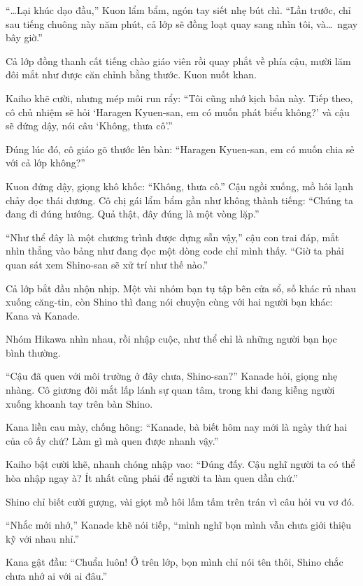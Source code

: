 \documentclass[../main.tex]{subfiles}
\begin{document}
``\dots Lại khúc dạo đầu,'' Kuon lẩm bẩm, ngón tay siết nhẹ bút chì. ``Lần trước, chỉ sau tiếng chuông này năm phút, cả lớp sẽ đồng loạt quay sang nhìn tôi, và\dots\ ngay bây giờ.''

Cả lớp đồng thanh cất tiếng chào giáo viên rồi quay phắt về phía cậu, mười lăm đôi mắt như được căn chỉnh bằng thước. Kuon nuốt khan.

Kaiho khẽ cười, nhưng mép môi run rẩy: ``Tôi cũng nhớ kịch bản này. Tiếp theo, cô chủ nhiệm sẽ hỏi `Haragen Kyuen-san, em có muốn phát biểu không?' và cậu sẽ đứng dậy, nói câu `Không, thưa cô'.''

Đúng lúc đó, cô giáo gõ thước lên bàn: ``Haragen Kyuen-san, em có muốn chia sẻ với cả lớp không?''

Kuon đứng dậy, giọng khô khốc: ``Không, thưa cô.'' Cậu ngồi xuống, mồ hôi lạnh chảy dọc thái dương. Cô chị gái lẩm bẩm gần như không thành tiếng: ``Chúng ta đang đi đúng hướng. Quả thật, đây đúng là một vòng lặp.''

``Như thể đây là một chương trình được dựng sẵn vậy,'' cậu con trai đáp, mắt nhìn thẳng vào bảng như đang đọc một dòng code chỉ mình thấy. ``Giờ ta phải quan sát xem Shino-san sẽ xử trí như thế nào.''

Cả lớp bắt đầu nhộn nhịp. Một vài nhóm bạn tụ tập bên cửa sổ, số khác rủ nhau xuống căng-tin, còn Shino thì đang nói chuyện cùng với hai người bạn khác: Kana và Kanade.

Nhóm Hikawa nhìn nhau, rồi nhập cuộc, như thể chỉ là những người bạn học bình thường.

``Cậu đã quen với môi trường ở đây chưa, Shino-san?'' Kanade hỏi, giọng nhẹ nhàng. Cô giương đôi mắt lấp lánh sự quan tâm, trong khi đang kiễng người xuống khoanh tay trên bàn Shino.

Kana liền cau mày, chống hông: ``Kanade, bà biết hôm nay mới là ngày thứ hai của cô ấy chứ? Làm gì mà quen được nhanh vậy.''

Kaiho bật cười khẽ, nhanh chóng nhập vao: ``Đúng đấy. Cậu nghĩ người ta có thể hòa nhập ngay à? Ít nhất cũng phải để người ta làm quen dần chứ.''

Shino chỉ biết cười gượng, vài giọt mồ hôi lấm tấm trên trán vì câu hỏi vu vơ đó.


``Nhắc mới nhớ,'' Kanade khẽ nói tiếp, ``mình nghĩ bọn mình vẫn chưa giới thiệu kỹ với nhau nhỉ.''

Kana gật đầu: ``Chuẩn luôn! Ở trên lớp, bọn mình chỉ nói tên thôi, Shino chắc chưa nhớ ai với ai đâu.''
\end{document}
